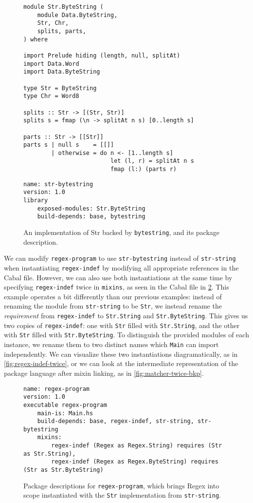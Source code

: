 \begin{figure}
\begin{lstlisting}
module Str.ByteString (
    module Data.ByteString,
    Str, Chr,
    splits, parts,
) where

import Prelude hiding (length, null, splitAt)
import Data.Word
import Data.ByteString

type Str = ByteString
type Chr = Word8

splits :: Str -> [(Str, Str)]
splits s = fmap (\n -> splitAt n s) [0..length s]

parts :: Str -> [[Str]]
parts s | null s    = [[]]
        | otherwise = do n <- [1..length s]
                         let (l, r) = splitAt n s
                         fmap (l:) (parts r)
\end{lstlisting}
\begin{lstlisting}[language=Cabal]
name: str-bytestring
version: 1.0
library
    exposed-modules: Str.ByteString
    build-depends: base, bytestring
\end{lstlisting}
\caption{An implementation of Str backed by \texttt{bytestring},
and its package description.}
\label{fig:str-bytestring}
\end{figure}

We can modify \verb|regex-program| to use \verb|str-bytestring| instead
of \verb|str-string| when instantiating \verb|regex-indef| by modifying
all appropriate references in the Cabal file.  However, we can also use
both instantiations at the same time by specifying \verb|regex-indef|
twice in \verb|mixins|, as seen in the Cabal file in
\cref{fig:regex-program-multi}.
This example operates a bit differently than our previous examples:
instead of renaming the module from \verb|str-string| to be \verb|Str|,
we instead rename the \emph{requirement} from \verb|regex-indef| to
\verb|Str.String| and \verb|Str.ByteString|.  This gives us two copies
of \verb|regex-indef|: one with \verb|Str| filled with
\verb|Str.String|, and the other with \verb|Str| filled with
\verb|Str.ByteString|.  To distinguish the provided modules of each
instance, we rename them to two distinct names which \verb|Main|
can import independently.  We can visualize these two instantiations
diagramatically, as in \cref{fig:regex-indef-twice}, or
we can look at the intermediate representation of the package language
after mixin linking, as in \cref{fig:matcher-twice-bkp}.

\begin{figure}
\begin{lstlisting}[language=Cabal]
name: regex-program
version: 1.0
executable regex-program
    main-is: Main.hs
    build-depends: base, regex-indef, str-string, str-bytestring
    mixins:
        regex-indef (Regex as Regex.String) requires (Str as Str.String),
        regex-indef (Regex as Regex.ByteString) requires (Str as Str.ByteString)
\end{lstlisting}
\caption{Package descriptions for \texttt{regex-program}, which brings
Regex into scope instantiated with the \texttt{Str} implementation from \texttt{str-string}.}
\label{fig:regex-program-multi}
\end{figure}


